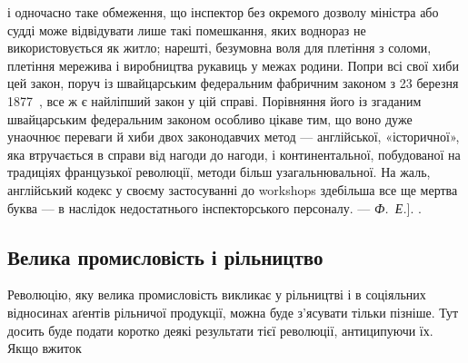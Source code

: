 {і одночасно таке обмеження, що інспектор без окремого дозволу міністра
або судді може відвідувати лише такі помешкання, яких воднораз не
використовується як житло; нарешті, безумовна воля для плетіння з
соломи, плетіння мережива і виробництва рукавиць у межах родини.
Попри всі свої хиби цей закон, поруч із швайцарським федеральним
фабричним законом з 23 березня 1877~, все ж є найліпший закон у цій
справі. Порівняння його із згаданим швайцарським федеральним законом
особливо цікаве тим, що воно дуже унаочнює переваги й хиби двох законодавчих
метод — англійської, «історичної», яка втручається в справи
від нагоди до нагоди, і континентальної, побудованої на традиціях французької
революції, методи більш узагальнювальної. На жаль, англійський
кодекс у своєму застосуванні до workshops здебільша все ще мертва
буква — в наслідок недостатнього інспекторського персоналу. — \emph{Ф.~Е.}].
}.\label{original-422}

\subsection{Велика промисловість і рільництво}

Революцію, яку велика промисловість викликає у рільництві
і в соціяльних відносинах аґентів рільничої продукції, можна
буде з’ясувати тільки пізніше. Тут досить буде подати коротко
деякі результати тієї революції, антиципуючи їх. Якщо вжиток
\parbreak{}  %
